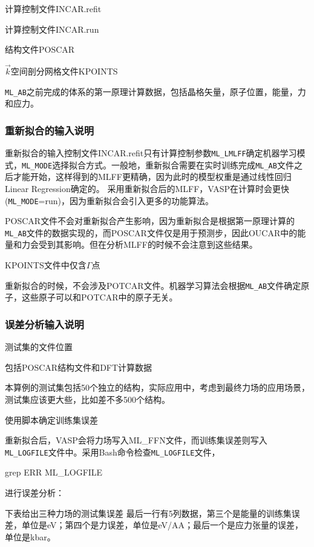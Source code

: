 计算控制文件\textrm{INCAR.refit}

计算控制文件\textrm{INCAR.run}

结构文件\textrm{POSCAR}

$\vec k$空间剖分网格文件\textrm{KPOINTS}

\texttt{ML\_AB}之前完成的体系的第一原理计算数据，包括晶格矢量，原子位置，能量，力和应力。

\subsubsection{重新拟合的输入说明}
重新拟合的输入控制文件\textrm{INCAR.refit}只有计算控制参数\texttt{ML\_LMLFF}确定机器学习模式，\texttt{ML\_MODE}选择拟合方式。一般地，重新拟合需要在实时训练完成\texttt{ML\_AB}文件之后才能开始，这样得到的\textrm{MLFF}更精确，因为此时的模型权重是通过线性回归\textrm{Linear Regression}确定的。%
采用重新拟合后的\textrm{MLFF}，\textrm{VASP}在计算时会更快(\texttt{ML\_MODE}=\textrm{run})，因为重新拟合会引入更多的功能算法。

\textrm{POSCAR}文件不会对重新拟合产生影响，因为重新拟合是根据第一原理计算的\texttt{ML\_AB}文件的数据实现的，而\textrm{POSCAR}文件仅是用于预测步，因此\textrm{OUCAR}中的能量和力会受到其影响。但在分析\textrm{MLFF}的时候不会注意到这些结果。

\textrm{KPOINTS}文件中仅含$\Gamma$点

重新拟合的时候，不会涉及\textrm{POTCAR}文件。机器学习算法会根据\texttt{ML\_AB}文件确定原子，这些原子可以和\textrm{POTCAR}中的原子无关。

\subsubsection{误差分析输入说明}
测试集的文件位置

包括\textrm{POSCAR}结构文件和\textrm{DFT}计算数据

本算例的测试集包括50个独立的结构，实际应用中，考虑到最终力场的应用场景，测试集应该更大些，比如差不多500个结构。

使用脚本确定训练集误差

重新拟合后，\textrm{VASP}会将力场写入\textrm{ML\_FFN}文件，而训练集误差则写入\texttt{ML\_LOGFILE}文件中。采用\textrm{Bash}命令检查\texttt{ML\_LOGFILE}文件，

\textrm{grep ERR ML\_LOGFILE}

进行误差分析：

下表给出三种力场的测试集误差
最后一行有5列数据，第三个是能量的训练集误差，单位是\textrm{eV}；第四个是力误差，单位是\textrm{eV/AA}；最后一个是应力张量的误差，单位是\textrm{kbar}。

